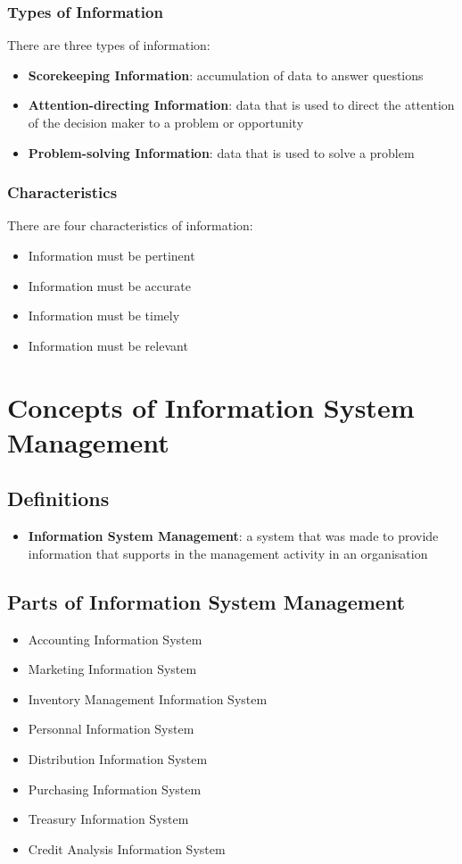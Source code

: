 \documentclass[12pt,titlepage]{article}
\begin{document}
\subsubsection{Types of Information}
There are three types of information:
\begin{itemize}
    \item \textbf{Scorekeeping Information}: accumulation of data to answer questions
    \item \textbf{Attention-directing Information}: data that is used to direct the attention of the decision maker to a problem or opportunity
    \item \textbf{Problem-solving Information}: data that is used to solve a problem
\end{itemize}

\subsubsection{Characteristics}
There are four characteristics of information:
\begin{itemize}
    \item Information must be pertinent
    \item Information must be accurate
    \item Information must be timely
    \item Information must be relevant
\end{itemize}

\section{Concepts of Information System Management}
\subsection{Definitions}
\begin{itemize}
    \item \textbf{Information System Management}: a system that was made to provide information that supports in the management activity in an organisation
\end{itemize}

\subsection{Parts of Information System Management}
\begin{itemize}
    \item Accounting Information System
    \item Marketing Information System
    \item Inventory Management Information System
    \item Personnal Information System
    \item Distribution Information System
    \item Purchasing Information System
    \item Treasury Information System
    \item Credit Analysis Information System
\end{itemize}
\end{document}
